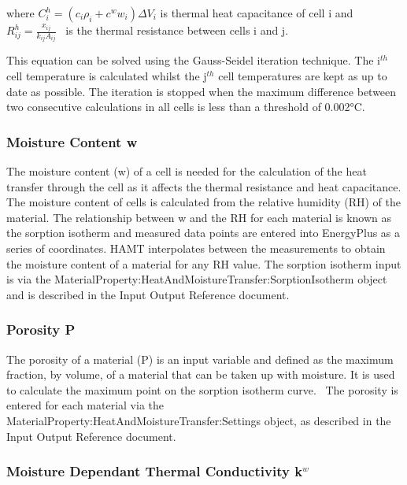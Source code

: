 where \(C_i^h = \left( {{c_i}{\rho_i} + {c^w}{w_i}} \right)\Delta {V_i}\) is thermal heat capacitance of cell i and \(R_{ij}^h = \frac{x_{ij}}{k_{ij}A_{ij}}\) ~is the thermal resistance between cells i and j.

This equation can be solved using the Gauss-Seidel iteration technique. The i\(^{th}\) cell temperature is calculated whilst the j\(^{th}\) cell temperatures are kept as up to date as possible. The iteration is stopped when the maximum difference between two consecutive calculations in all cells is less than a threshold of 0.002°C.

\subsubsection{Moisture Content w}\label{moisture-content-w}

The moisture content (w) of a cell is needed for the calculation of the heat transfer through the cell as it affects the thermal resistance and heat capacitance. The moisture content of cells is calculated from the relative humidity (RH) of the material. The relationship between w and the RH for each material is known as the sorption isotherm and measured data points are entered into EnergyPlus as a series of coordinates. HAMT interpolates between the measurements to obtain the moisture content of a material for any RH value. The sorption isotherm input is via the MaterialProperty:HeatAndMoistureTransfer:SorptionIsotherm object and is described in the Input Output Reference document.

\subsubsection{Porosity P}\label{porosity-p}

The porosity of a material (P) is an input variable and defined as the maximum fraction, by volume, of a material that can be taken up with moisture. It is used to calculate the maximum point on the sorption isotherm curve. ~The porosity is entered for each material via the MaterialProperty:HeatAndMoistureTransfer:Settings object, as described in the Input Output Reference document.

\subsubsection{Moisture Dependant Thermal Conductivity k\(^{w}\)}\label{moisture-dependant-thermal-conductivity-kw}

